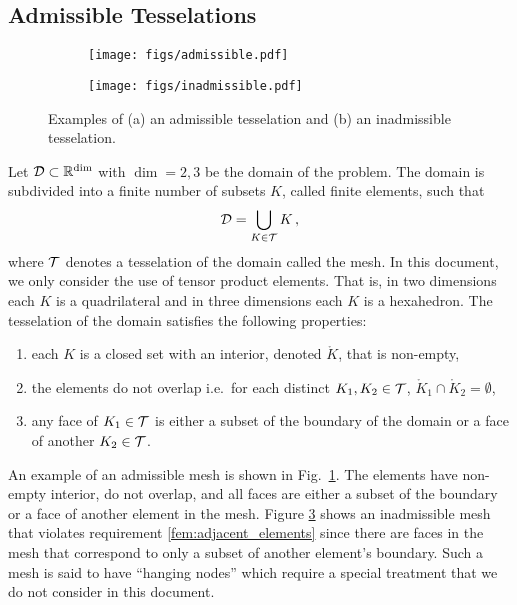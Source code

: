 \documentclass[../doc.tex]{subfiles}
\begin{document}
\subsection{Admissible Tesselations}
\begin{figure}
\centering
\begin{subfigure}{.45\textwidth}
	\centering
	\texttt{[image: figs/admissible.pdf]}
	\caption{}
	\label{fem:admissible}
\end{subfigure}
\begin{subfigure}{.45\textwidth}
	\centering
	\texttt{[image: figs/inadmissible.pdf]}
	\caption{}
	\label{fem:inadmissible}
\end{subfigure}
\caption{Examples of (a) an admissible tesselation and (b) an inadmissible tesselation.}
\end{figure}

Let $\mathcal{D} \subset \mathbb{R}^{\dim}$ with $\dim = 2,3$ be the domain of the problem. The domain is subdivided into a finite number of subsets $K$, called finite elements, such that 
	\begin{equation}
		\mathcal{D} = \bigcup_{K \in \mathcal{T}} K \,, 
	\end{equation}
where $\mathcal{T}$ denotes a tesselation of the domain called the mesh. 
In this document, we only consider the use of tensor product elements. That is, in two dimensions each $K$ is a quadrilateral and in three dimensions each $K$ is a hexahedron. The tesselation of the domain satisfies the following properties: 
	\begin{enumerate}
		\item each $K$ is a closed set with an interior, denoted $\mathring{K}$, that is non-empty, 
		\item the elements do not overlap i.e.~for each distinct $K_1,K_2 \in \mathcal{T}$, $\mathring{K}_1 \cap \mathring{K}_2 = \emptyset$,
		\item \label{fem:adjacent_elements}any face of $K_1 \in \mathcal{T}$ is either a subset of the boundary of the domain or a face of another $K_2 \in \mathcal{T}$.  
	\end{enumerate}
An example of an admissible mesh is shown in Fig.~\ref{fem:admissible}. The elements have non-empty interior, do not overlap, and all faces are either a subset of the boundary or a face of another element in the mesh. Figure \ref{fem:inadmissible} shows an inadmissible mesh that violates requirement \ref{fem:adjacent_elements} since there are faces in the mesh that correspond to only a subset of another element's boundary. Such a mesh is said to have ``hanging nodes'' which require a special treatment that we do not consider in this document. 
\end{document}
